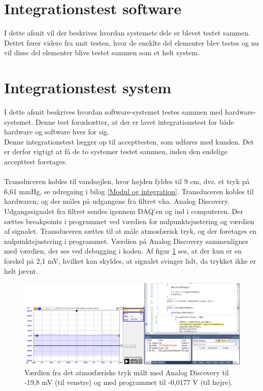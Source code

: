 \section{Integrationstest software}
I dette afsnit vil der beskrives hvordan systemets dele er blevet testet sammen. Dettet fører videre fra unit testen, hvor de eneklte del elementer blev testes og nu vil disse del elementer blive testet sammen som et helt system. 

\section{Integrationstest system}
I dette afsnit beskrives hvordan software-systemet testes sammen med hardware-systemet. Denne test forudsætter, at der er lavet integrationstest for både hardware og software hver for sig. \\
Denne integrationstest lægger op til accepttesten, som udføres med kunden. Det er derfor vigtigt at få de to systemer testet sammen, inden den endelige accepttest foretages. \\
\\
Transduceren kobles til vandsøjlen, hvor højden fyldes til 9 cm, dvs. et tryk på 6,61 mmHg, se udregning i bilag \ref{Modul og integration}. Transduceren kobles til hardwaren, og der måles på udgangene fra filtret vha. Analog Discovery. Udgangssignalet fra filtret sendes igennem DAQ’en og ind i computeren. Der sættes breakpoints i programmet ved værdien for nulpunktsjustering og værdien af signalet. 
Transduceren sættes til at måle atmosfærisk tryk, og der foretages en nulpunktsjustering i programmet. Værdien på Analog Discovery sammenlignes med værdien, der ses ved debugging i koden. Af figur \ref{fig:Atmosfaerisktryk} ses, at der kun er en forskel på 2,1 mV, hvilket kan skyldes, at signalet svinger lidt, da trykket ikke er helt jævnt.

\begin{figure}[H]
	\centering
	\includegraphics[width=1.2\textwidth]{Figurer/Test/Nulpunkt}
	\caption{Værdien fra det atmosfæriske tryk målt med Analog Discovery til -19,8 mV (til venstre) og med programmet til -0,0177 V (til højre).}
	\label{fig:Atmosfaerisktryk}
\end{figure}

